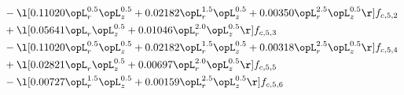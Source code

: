 \begin{alignat}{2}
& - \l[  0.11020 \opL_r^{0.5} \opL_z^{0.5} +  0.02182 \opL_r^{1.5} \opL_z^{0.5} +  0.00350 \opL_r^{2.5} \opL_z^{0.5}  \r] f_{c,5,2} \nonumber \\ 
& + \l[  0.05641 \opL_r \opL_z^{0.5} +  0.01046 \opL_r^{2.0} \opL_z^{0.5}  \r] f_{c,5,3} \nonumber \\ 
& - \l[  0.11020 \opL_r^{0.5} \opL_z^{0.5} +  0.02182 \opL_r^{1.5} \opL_z^{0.5} +  0.00318 \opL_r^{2.5} \opL_z^{0.5}  \r] f_{c,5,4} \nonumber \\ 
& + \l[  0.02821 \opL_r \opL_z^{0.5} +  0.00697 \opL_r^{2.0} \opL_z^{0.5}  \r] f_{c,5,5} \nonumber \\ 
& - \l[  0.00727 \opL_r^{1.5} \opL_z^{0.5} +  0.00159 \opL_r^{2.5} \opL_z^{0.5}  \r] f_{c,5,6} \nonumber \\ 
\end{alignat} 



